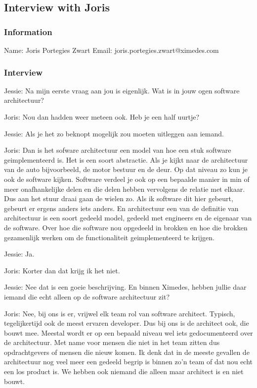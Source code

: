 \subsection{Interview with Joris}

\subsubsection*{Information}
Name: Joris Portegies Zwart
Email: joris.portegies.zwart@ximedes.com

\subsubsection*{Interview}

Jessie: Na mijn eerste vraag aan jou is eigenlijk. Wat is in jouw ogen software architectuur?

Joris: Nou dan hadden weer meteen ook. Heb je een half uurtje?

Jessie: Als je het zo beknopt mogelijk zou moeten uitleggen aan iemand.

Joris: Dan is het sofware architectuur een model van hoe een stuk software geimplementeerd is. Het is een soort abstractie. Als je kijkt naar de architectuur van de auto bijvoorbeeld, de motor bestuur en de deur. Op dat niveau zo kun je ook de software kijken. Software verdeel je ook op een bepaalde manier in min of meer onafhankelijke delen en die delen hebben vervolgens de relatie met elkaar. Dus aan het stuur draai gaan de wielen zo. Als ik software dit hier gebeurt, gebeurt er ergens anders iets anders. En architectuur een van de definitie van architectuur is een soort gedeeld model, gedeeld met engineers en de eigenaar van de software. Over hoe die software nou opgedeeld in brokken en hoe die brokken gezamenlijk werken om de functionaliteit geimplementeerd te krijgen.

Jessie: Ja.

Joris: Korter dan dat krijg ik het niet.

Jessie: Nee dat is een goeie beschrijving. En binnen Ximedes, hebben jullie daar iemand die echt alleen op de software architectuur zit?

Joris: Nee, bij ons is er, vrijwel elk team rol van software architect. Typisch, tegelijkertijd ook de meest ervaren developer. Dus bij ons is de architect ook, die bouwt mee. Meestal wordt er op een bepaald niveau wel iets gedocumenteerd over de architectuur. Met name voor mensen die niet in het team zitten dus opdrachtgevers of mensen die nieuw komen. Ik denk dat in de meeste gevallen de architectuur nog veel meer een gedeeld begrip is binnen zo'n team of dat nou echt een los product is. We hebben ook niemand die alleen maar architect is en niet bouwt.

